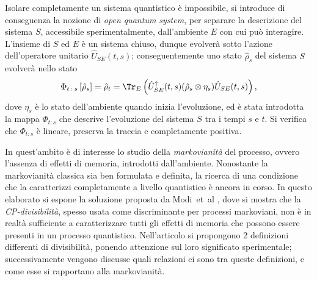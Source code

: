
Isolare completamente un sistema quantistico è impossibile, si introduce di conseguenza la nozione di \emph{open quantum system}, per separare la descrizione del sistema \(S\), accessibile sperimentalmente, dall'ambiente \(E\) con cui può interagire. L'insieme di \(S\) ed \(E\) è un sistema chiuso, dunque evolverà sotto l'azione dell'operatore unitario \(\hat{U}_{SE}(t,s)\); conseguentemente uno stato \(\hat{\rho}_s\) del sistema \(S\) evolverà nello stato
\[\Phi_{t\colon s}\left[\hat{\rho}_s\right]=\hat{\rho}_t = \Tr_E\left(\hat{U}^\dag_{SE}(t,s)(\hat{\rho}_s\otimes\eta_s)\hat{U}_{SE}(t,s)\right),\]
dove \(\eta_s\) è lo stato dell'ambiente quando inizia l'evoluzione, ed è stata introdotta la mappa \(\Phi_{t\colon s}\) che descrive l'evoluzione del sistema \(S\) tra i tempi \(s\) e \(t\). Si verifica che \(\Phi_{t\colon s}\) è lineare, preserva la traccia e completamente positiva.

In quest'ambito è di interesse lo studio della \emph{markovianità} del processo, ovvero l'assenza di effetti di memoria, introdotti dall'ambiente. Nonostante la markovianità classica sia ben formulata e definita, la ricerca di una condizione che la caratterizzi completamente a livello quantistico è ancora in corso. In questo elaborato si espone la soluzione proposta da Modi~et~al \cite{CPdoesnotimply}, dove si mostra che la \emph{CP-divisibilità}, spesso usata come discriminante per processi markoviani, non è in realtà sufficiente a caratterizzare tutti gli effetti di memoria che possono essere presenti in un processo quantistico. Nell'articolo si propongono 2 definizioni differenti di divisibilità, ponendo attenzione sul loro significato sperimentale; successivamente vengono discusse quali relazioni ci sono tra queste definizioni, e come esse si rapportano alla markovianità.

